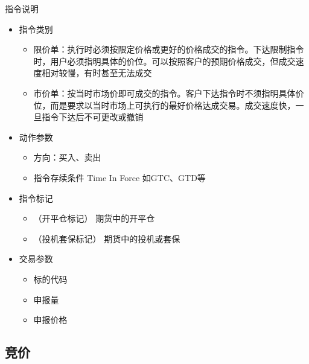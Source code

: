 \begin{frame}{指令说明}
  \begin{itemize}
  \item 指令类别
    \begin{itemize}
    \item 限价单：执行时必须按限定价格或更好的价格成交的指令。下达限制指令时，用户必须指明具体的价位。可以按照客户的预期价格成交，但成交速度相对较慢，有时甚至无法成交
    \item 市价单：按当时市场价即可成交的指令。客户下达指令时不须指明具体价位，而是要求以当时市场上可执行的最好价格达成交易。成交速度快，一旦指令下达后不可更改或撤销
    \end{itemize}
  \item 动作参数
    \begin{itemize}
    \item 方向：买入、卖出
    \item 指令存续条件 Time In Force 如GTC、GTD等
    \end{itemize}
  \item 指令标记
    \begin{itemize}
    \item （开平仓标记） 期货中的开平仓
    \item （投机套保标记） 期货中的投机或套保
    \end{itemize}
  \item 交易参数
    \begin{itemize}
    \item 标的代码
    \item 申报量
    \item 申报价格
    \end{itemize}
  \end{itemize}
\end{frame}

\subsection{竞价}

